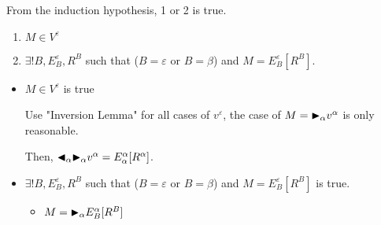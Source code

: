 \begin{itemize}
\begin{itemize}
	      	      From the induction hypothesis, 1 or 2 is true.
	      	      \begin{enumerate}
	      	      	\item $ M \in V^\varepsilon$
	      	      	\item $\exists ! B, E^\varepsilon_B, R^B$ such that ($B = \varepsilon$ or $B = \beta$) and $M = E^\varepsilon_B[R^B]$.
	      	      \end{enumerate}
	      	      	      	      	      	      	      	      	      	      	      	      	      	      	      	      		      	      	      	      	      	      	      	      
	      	      \begin{itemize}
	      	      	\item $ M \in V^\varepsilon$ is true
	      	      	      	      	      	      	      	      	      	      	      	      	      	      	      	      	      	      	      	      	      	      	      	      		      	      	      	      	      	      	      	      	      	      	      	      
	      	      	      Use "Inversion Lemma" for all cases of $v^\varepsilon$, the case of $ M = {\mathop{\blacktriangleright}}_\alpha v^\alpha $ is only reasonable.
	      	      	      	      	      	      	      	      	      	      	      	      	      	      	      	      	      	      	      	      	      	      	      	      		      	      	      	      	      	      	      	      	      	      	      	      
	      	      	      Then, ${\mathop{\blacktriangleleft}}_\alpha {\mathop{\blacktriangleright}}_\alpha v^\alpha = E^\alpha_\alpha [R^\alpha]$.
	      	      	      	      	      	      	      	      	      	      	      	      	      	      	      	      	      	      	      	      	      	      	      	      		      	      	      	      	      	      	      	      	      	      	      	      
	      	      	\item $\exists ! B, E^\varepsilon_B, R^B$ such that ($B = \varepsilon$ or $B = \beta$) and $M = E^\varepsilon_B[R^B]$ is true.
	      	      	      	      	      	      	      	      	      	      	      	      	      	      	      	      	      	      	      	      	      	      	      	      		      	      	      	      	      	      	      	      	      	      	      	      
	      	      	      \begin{itemize}
	      	      	      	\item $ M = {\mathop{\blacktriangleright}}_\alpha E^\alpha_B[R^B] $
	      	      	      	      	      	      	      	      	      	      	      	      	      	      	      	      	      	      	      	      	      	      	      	      	      	      	      	      	      	      	      	      		      	      	      	      	      	      	      	      	      	      	      	      	      	      	      	      

\end{itemize}
\end{itemize}
\end{itemize}
\end{itemize}
